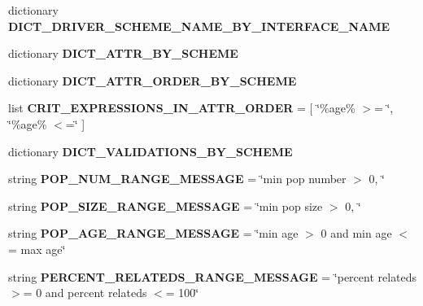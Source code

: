 \begin{DoxyCompactItemize}
\item 
dictionary {\bfseries D\+I\+C\+T\+\_\+\+D\+R\+I\+V\+E\+R\+\_\+\+S\+C\+H\+E\+M\+E\+\_\+\+N\+A\+M\+E\+\_\+\+B\+Y\+\_\+\+I\+N\+T\+E\+R\+F\+A\+C\+E\+\_\+\+N\+A\+ME}
\item 
dictionary {\bfseries D\+I\+C\+T\+\_\+\+A\+T\+T\+R\+\_\+\+B\+Y\+\_\+\+S\+C\+H\+E\+ME}
\item 
dictionary {\bfseries D\+I\+C\+T\+\_\+\+A\+T\+T\+R\+\_\+\+O\+R\+D\+E\+R\+\_\+\+B\+Y\+\_\+\+S\+C\+H\+E\+ME}
\item 
list {\bfseries C\+R\+I\+T\+\_\+\+E\+X\+P\+R\+E\+S\+S\+I\+O\+N\+S\+\_\+\+I\+N\+\_\+\+A\+T\+T\+R\+\_\+\+O\+R\+D\+ER} = \mbox{[} \char`\"{}\%age\% $>$= \char`\"{}, \char`\"{}\%age\% $<$=\char`\"{} \mbox{]}\hypertarget{classnegui_1_1pgutilityclasses_1_1NeEstimatorSamplingSchemeParameterManager_a13dee0f3e9095ee7a146c709835e5d54}{}\label{classnegui_1_1pgutilityclasses_1_1NeEstimatorSamplingSchemeParameterManager_a13dee0f3e9095ee7a146c709835e5d54}

\item 
dictionary {\bfseries D\+I\+C\+T\+\_\+\+V\+A\+L\+I\+D\+A\+T\+I\+O\+N\+S\+\_\+\+B\+Y\+\_\+\+S\+C\+H\+E\+ME}
\item 
string {\bfseries P\+O\+P\+\_\+\+N\+U\+M\+\_\+\+R\+A\+N\+G\+E\+\_\+\+M\+E\+S\+S\+A\+GE} = \char`\"{}min pop number $>$ 0, \char`\"{}\hypertarget{classnegui_1_1pgutilityclasses_1_1NeEstimatorSamplingSchemeParameterManager_acf3a7ef821571fe06c668a62cbb940b8}{}\label{classnegui_1_1pgutilityclasses_1_1NeEstimatorSamplingSchemeParameterManager_acf3a7ef821571fe06c668a62cbb940b8}

\item 
string {\bfseries P\+O\+P\+\_\+\+S\+I\+Z\+E\+\_\+\+R\+A\+N\+G\+E\+\_\+\+M\+E\+S\+S\+A\+GE} = \char`\"{}min pop size $>$ 0, \char`\"{}\hypertarget{classnegui_1_1pgutilityclasses_1_1NeEstimatorSamplingSchemeParameterManager_af6e99988635c4129d28d0a86d4a2dd9f}{}\label{classnegui_1_1pgutilityclasses_1_1NeEstimatorSamplingSchemeParameterManager_af6e99988635c4129d28d0a86d4a2dd9f}

\item 
string {\bfseries P\+O\+P\+\_\+\+A\+G\+E\+\_\+\+R\+A\+N\+G\+E\+\_\+\+M\+E\+S\+S\+A\+GE} = \char`\"{}min age $>$ 0 and min age $<$= max age\char`\"{}\hypertarget{classnegui_1_1pgutilityclasses_1_1NeEstimatorSamplingSchemeParameterManager_a2732b38d3af83e1e3c652eafd8fe93df}{}\label{classnegui_1_1pgutilityclasses_1_1NeEstimatorSamplingSchemeParameterManager_a2732b38d3af83e1e3c652eafd8fe93df}

\item 
string {\bfseries P\+E\+R\+C\+E\+N\+T\+\_\+\+R\+E\+L\+A\+T\+E\+D\+S\+\_\+\+R\+A\+N\+G\+E\+\_\+\+M\+E\+S\+S\+A\+GE} = \char`\"{}percent relateds $>$= 0 and percent relateds $<$= 100\char`\"{}\hypertarget{classnegui_1_1pgutilityclasses_1_1NeEstimatorSamplingSchemeParameterManager_ab8f9a761598d639b264f157e95e2bd98}{}\label{classnegui_1_1pgutilityclasses_1_1NeEstimatorSamplingSchemeParameterManager_ab8f9a761598d639b264f157e95e2bd98}


\end{DoxyCompactItemize}
